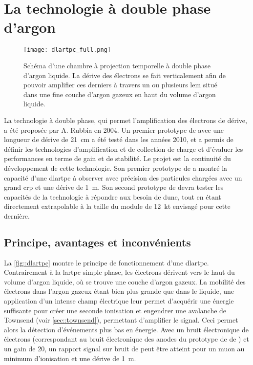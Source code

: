     
  \section{La technologie à double phase d'argon}\label{sec::dlartpc}
 
    \begin{figure}[htbp]
      \centering
      \texttt{[image: dlartpc\_full.png]}
      \caption[Schéma d'une chambre à projection temporelle à double phase d'argon liquide]{\label{fig::dlartpc}Schéma d'une chambre à projection temporelle à double phase d'argon liquide. La dérive des électrons se fait verticalement afin de pouvoir amplifier ces derniers à travers un ou plusieurs \acrfull{lem} situé dans une fine couche d'argon gazeux en haut du volume d'argon liquide.}
    \end{figure}

    La technologie à double phase, qui permet l'amplification des électrons de dérive, a été proposée par A. Rubbia\cite{Rubbia2004} en 2004. Un premier prototype de \threeL{} avec une longueur de dérive de \SI{21}{\centi\meter} a été testé dans les années 2010, et a permis de définir les technologies d'amplification et de collection de charge\cite{Cantini2013} et d'évaluer les performances en terme de gain et de stabilité\cite{Cantini2014}. Le projet \protodp{} est la continuité du développement de cette technologie. Son premier prototype de \TOO{} a montré la capacité d'une \gls{dlartpc} à observer avec précision des particules chargées avec un grand \gls{crp} et une dérive de \SI{1}{\meter}. Son second prototype de \SSS{} devra tester les capacités de la technologie à répondre aux besoin de \gls{dune}, tout en étant directement extrapolable à la taille du module de \SI{12}{\kilo\tonne} envisagé pour cette dernière.

    \subsection{Principe, avantages et inconvénients}

      La \autoref{fig::dlartpc} montre le principe de fonctionnement d'une \gls{dlartpc}. Contrairement à la \gls{lartpc} simple phase, les électrons dérivent vers le haut du volume d'argon liquide, où se trouve une couche d'argon gazeux. La mobilité des électrons dans l'argon gazeux étant bien plus grande que dans le liquide, une application d'un intense champ électrique leur permet d'acquérir une énergie suffisante pour créer une seconde ionisation et engendrer une avalanche de Townsend (voir \autoref{sec::townsend}), permettant d'amplifier le signal. Ceci permet alors la détection d'événements plus bas en énergie. Avec un bruit électronique de  électrons (correspondant au bruit électronique des anodes du prototype de \TOO{} de \protodp{}) et un gain de 20, un rapport signal sur bruit de  peut être atteint pour un muon au minimum d'ionisation et une dérive de \SI{1}{\meter}.
      
